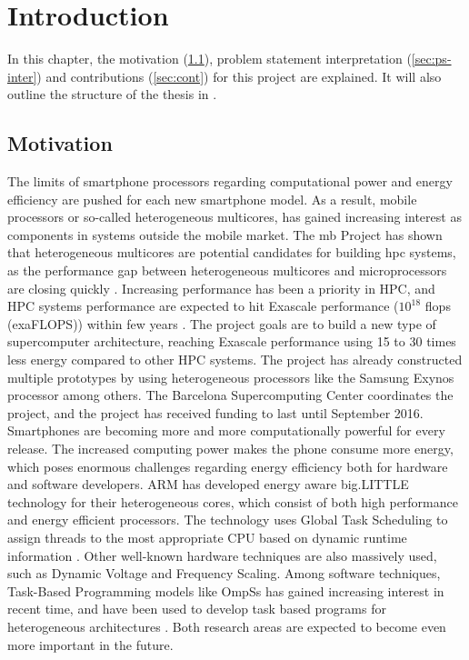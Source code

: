 \chapter{Introduction}
In this chapter, the motivation (\ref{sec:mot}), problem statement interpretation (\ref{sec:ps-inter}) and contributions (\ref{sec:cont}) for this project are explained. It will also outline the structure of the thesis in .

\section{Motivation}
\label{sec:mot}
The limits of smartphone processors regarding computational power and energy efficiency are pushed for each new smartphone model. As a result, mobile processors or so-called heterogeneous multicores, has gained increasing interest as components in systems outside the mobile market. The \gls{mb} Project \cite{MB} has shown that heterogeneous multicores are potential candidates for building \gls{hpc} systems, as the performance gap between heterogeneous multicores and microprocessors are closing quickly \cite{a:MB:Raj13}. Increasing performance has been a priority in HPC, and HPC systems performance are expected to hit Exascale performance ($10^{18}$ \gls{flops} (exaFLOPS)) within few years \cite{TOP500}. The project goals are to build a new type of supercomputer architecture, reaching Exascale performance using 15 to 30 times less energy compared to other HPC systems. The project has already constructed multiple prototypes by using heterogeneous processors like the Samsung Exynos \cite{EXY} processor among others. The Barcelona Supercomputing Center coordinates the project, and the project has received funding to last until September 2016. \\

Smartphones are becoming more and more computationally powerful for every release. The increased computing power makes the phone consume more energy, which poses enormous challenges regarding energy efficiency both for hardware and software developers. ARM has developed energy aware big.LITTLE technology for their heterogeneous cores, which consist of both high performance and energy efficient processors. The technology uses Global Task Scheduling to assign threads to the most appropriate CPU based on dynamic runtime information \cite{a:ARM:bL}. Other well-known hardware techniques are also massively used, such as Dynamic Voltage and Frequency Scaling. Among software techniques, Task-Based Programming models like OmpSs \cite{a:ompss2013} has gained increasing interest in recent time, and have been used to develop task based programs for heterogeneous architectures \cite{a:Lien2012}. Both research areas are expected to become even more important in the future. \\

